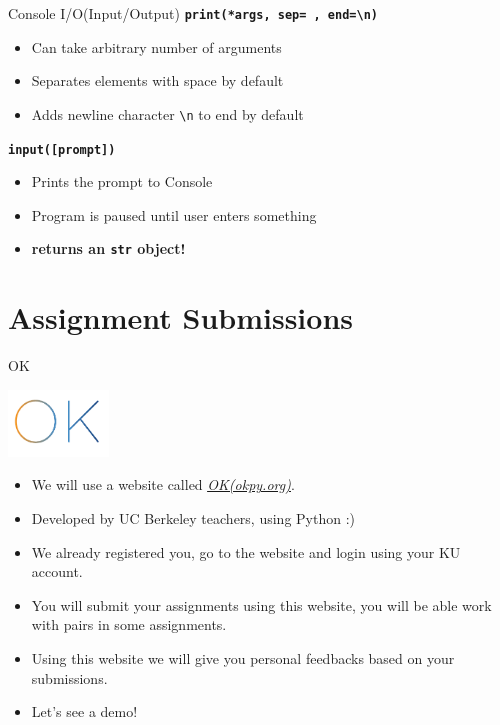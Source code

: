     \begin{frame}{Console I/O(Input/Output)}
			\huge
			\textbf{\texttt{print(*args, sep=\textquotesingle \ \textquotesingle, end=\textquotesingle \textbackslash n\textquotesingle )}}
			\begin{itemize}
				\LARGE
				\item Can take arbitrary number of arguments
				\item Separates elements with space by default
				\item Adds newline character \texttt{\textquotesingle \textbackslash n\textquotesingle} to end by default
			\end{itemize}
			
			\textbf{\texttt{input([prompt])}}
			\begin{itemize}
				\LARGE
				\item Prints the prompt to Console
				\item Program is paused until user enters something
				\item \textbf{returns an \texttt{str} object!} 
			\end{itemize}
    \end{frame}
    
  \section{Assignment Submissions}
    
    \begin{frame}{OK}
      \begin{center}
        \includegraphics[width=0.2\textwidth]{images/okpy.png}
      \end{center}
      \pause
      \begin{itemize}
        \item We will use a website called \href{https://okpy.org/}{\underline{\textit{OK(okpy.org)}}}.
        \pause
        \item Developed by UC Berkeley teachers, using Python :)
        \pause
        \item We already registered you, go to the website and login using your KU account.
        \pause
        \item You will submit your assignments using this website, you will be able work with pairs in some assignments.
        \pause
        \item Using this website we will give you personal feedbacks based on your submissions.
        \pause
        \item Let's see a demo!
      \end{itemize}
    \end{frame}

